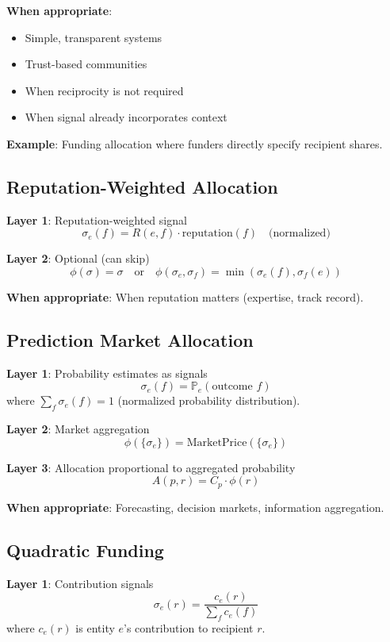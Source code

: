 \documentclass[11pt,a4paper]{article}
\theoremstyle{definition}
\theoremstyle{remark}
\begin{document}
\textbf{When appropriate}:
\begin{itemize}
\item Simple, transparent systems
\item Trust-based communities
\item When reciprocity is not required
\item When signal already incorporates context
\end{itemize}

\textbf{Example}: Funding allocation where funders directly specify recipient shares.

\subsection{Reputation-Weighted Allocation}

\textbf{Layer 1}: Reputation-weighted signal
\[ \sigma_e(f) = R(e,f) \cdot \text{reputation}(f) \quad \text{(normalized)} \]

\textbf{Layer 2}: Optional (can skip)
\[ \phi(\sigma) = \sigma \quad \text{or} \quad \phi(\sigma_e, \sigma_f) = \min(\sigma_e(f), \sigma_f(e)) \]

\textbf{When appropriate}: When reputation matters (expertise, track record).

\subsection{Prediction Market Allocation}

\textbf{Layer 1}: Probability estimates as signals
\[ \sigma_e(f) = \mathbb{P}_e(\text{outcome } f) \]
where $\sum_f \sigma_e(f) = 1$ (normalized probability distribution).

\textbf{Layer 2}: Market aggregation
\[ \phi(\{\sigma_e\}) = \text{MarketPrice}(\{\sigma_e\}) \]

\textbf{Layer 3}: Allocation proportional to aggregated probability
\[ A(p,r) = C_p \cdot \phi(r) \]

\textbf{When appropriate}: Forecasting, decision markets, information aggregation.

\subsection{Quadratic Funding}

\textbf{Layer 1}: Contribution signals
\[ \sigma_e(r) = \frac{c_e(r)}{\sum_f c_e(f)} \]
where $c_e(r)$ is entity $e$'s contribution to recipient $r$.
\end{document}
